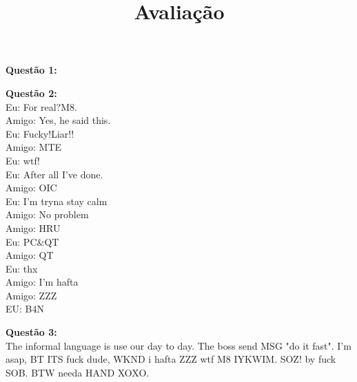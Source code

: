 \documentclass[a4paper,12pt]{article}
\title{Avalia\c c\~ao}
\begin{document}
\maketitle\thispagestyle{fancy}
\textbf{Quest\~ao 1:}
\begin{figure}[!h]
	\centering
\end{figure}

\begin{figure}[!h]
	\centering
\end{figure}
\newpage
\textbf{Quest\~ao 2:}\\
Eu: For real?M8.\\
Amigo: Yes, he said this.\\
Eu: Fucky!Liar!!\\
Amigo: MTE\\
Eu: wtf!\\
Eu: After all I've done.\\
Amigo: OIC\\
Eu: I'm tryna stay calm\\
Amigo: No problem\\
Amigo: HRU\\
Eu: PC\&QT \\
Amigo: QT\\ 
Eu: thx\\
Amigo: I'm hafta \\ 
Amigo: ZZZ \\
EU: B4N

\textbf{Quest\~ao 3:}\\
The informal language is use our day to day. The boss send MSG "do it fast". I'm asap, BT ITS fuck dude, WKND i hafta
ZZZ wtf M8 IYKWIM. SOZ! by fuck SOB. BTW needa HAND XOXO.
\end{document}
